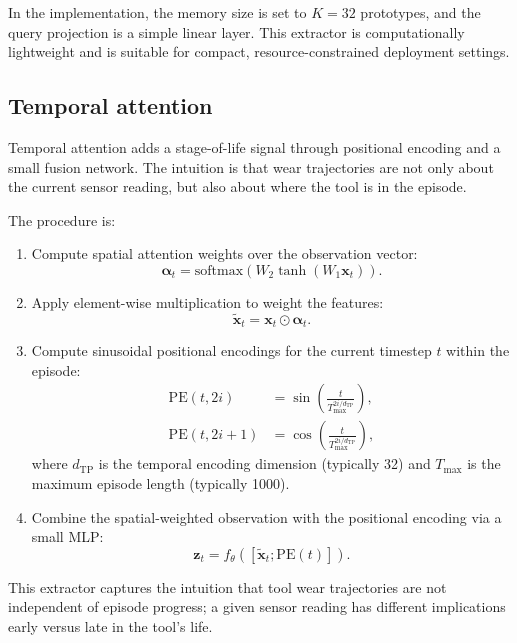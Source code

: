 \documentclass[12pt,oneside]{book}
\begin{document}
In the implementation, the memory size is set to $K = 32$ prototypes, and the query projection is a simple linear layer. This extractor is computationally lightweight and is suitable for compact, resource-constrained deployment settings.

\subsection{Temporal attention}
Temporal attention adds a stage-of-life signal through positional encoding and a small fusion network. The intuition is that wear trajectories are not only about the current sensor reading, but also about where the tool is in the episode.

The procedure is:
\begin{enumerate}
\item Compute spatial attention weights over the observation vector:
\begin{equation}
\boldsymbol{\alpha}_t = \mathrm{softmax}(W_2 \tanh(W_1 \mathbf{x}_t)).
\end{equation}
\item Apply element-wise multiplication to weight the features:
\begin{equation}
\tilde{\mathbf{x}}_t = \mathbf{x}_t \odot \boldsymbol{\alpha}_t.
\end{equation}
\item Compute sinusoidal positional encodings for the current timestep $t$ within the episode:
\begin{align}
\mathrm{PE}(t, 2i) &= \sin\left(\frac{t}{T_{\max}^{2i/d_{\mathrm{TP}}}}\right),\\
\mathrm{PE}(t, 2i+1) &= \cos\left(\frac{t}{T_{\max}^{2i/d_{\mathrm{TP}}}}\right),
\end{align}
where $d_{\mathrm{TP}}$ is the temporal encoding dimension (typically 32) and $T_{\max}$ is the maximum episode length (typically 1000).
\item Combine the spatial-weighted observation with the positional encoding via a small MLP:
\begin{equation}
\mathbf{z}_t = f_{\theta}([\tilde{\mathbf{x}}_t; \mathrm{PE}(t)]).
\end{equation}
\end{enumerate}

This extractor captures the intuition that tool wear trajectories are not independent of episode progress; a given sensor reading has different implications early versus late in the tool's life.
\end{document}
